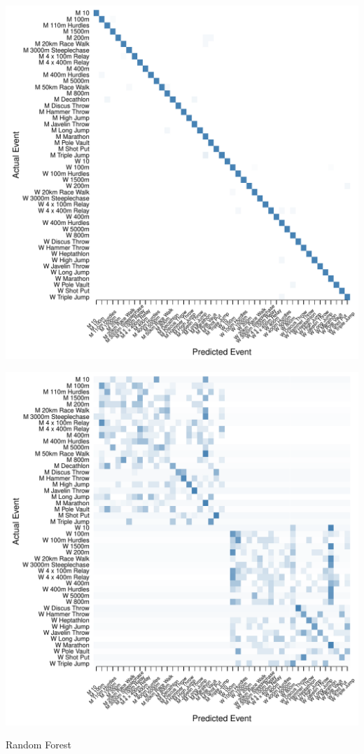 \documentclass[landscape, paperwidth=42in, paperheight=36in,
fontscale=.35, margin=1in]{baposter}
\begin{document}
\begin{poster}
{\begin{center}
  \begin{minipage}{0.45\textwidth}
    \begin{center}
      \includegraphics[scale=0.27]{../graphics/athletesRF-trn.pdf}
    \end{center}
  \end{minipage}
  \hspace{0.05\textwidth}
  \begin{minipage}{0.45\textwidth}
    \begin{center}
      \includegraphics[scale=0.27]{../graphics/athletesRF-tst.pdf}
    \end{center}
  \end{minipage}
  Random Forest \\



\end{center}}
\end{poster}
\end{document}
